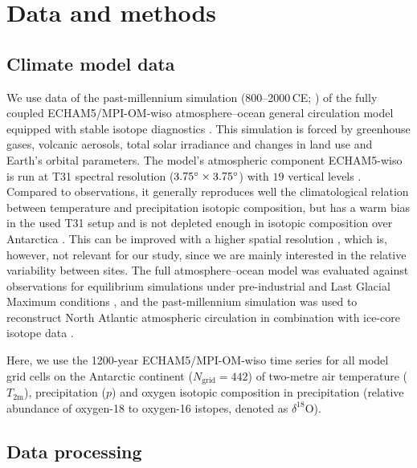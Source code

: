 \documentclass[cp, manuscript]{copernicus}
\begin{document}
\section{Data and methods}\label{methods}

\subsection{Climate model data}\label{methods:data}

We use data of the past-millennium simulation (800--2000\,CE;
\citealp{Sjolte2018}) of the fully coupled ECHAM5/MPI-OM-wiso atmosphere--ocean
general circulation model equipped with stable isotope diagnostics
\citep{Werner2016}. This simulation is forced by greenhouse gases, volcanic
aerosols, total solar irradiance and changes in land use and Earth's orbital
parameters. The model's atmospheric component ECHAM5-wiso is run at T31 spectral
resolution ($3.75^{\circ}\times3.75^{\circ}$) with $19$ vertical levels
\citep{Sjolte2018}. Compared to observations, it generally reproduces well the
climatological relation between temperature and precipitation isotopic
composition, but has a warm bias in the used T31 setup and is not
depleted enough in isotopic composition over Antarctica \citep{Werner2011}. This
can be improved with a higher spatial resolution \citep{Werner2011}, which is,
however, not relevant for our study, since we are mainly interested in the
relative variability between sites. The full atmosphere--ocean model was
evaluated against observations for equilibrium simulations under pre-industrial
and Last Glacial Maximum conditions \citep{Werner2016}, and the past-millennium
simulation was used to reconstruct North Atlantic atmospheric circulation in
combination with ice-core isotope data \citep{Sjolte2018}.

Here, we use the 1200-year ECHAM5/MPI-OM-wiso time series for all model grid
cells on the Antarctic continent ($N_{\mathrm{grid}}=442$) of two-metre air
temperature ($T_{2\mathrm{m}}$), precipitation ($p$) and oxygen isotopic
composition in precipitation (relative abundance of oxygen-18 to oxygen-16
istopes, denoted as $\delta^{18}\mathrm{O}$).

\subsection{Data processing}\label{methods:prc}
\end{document}
